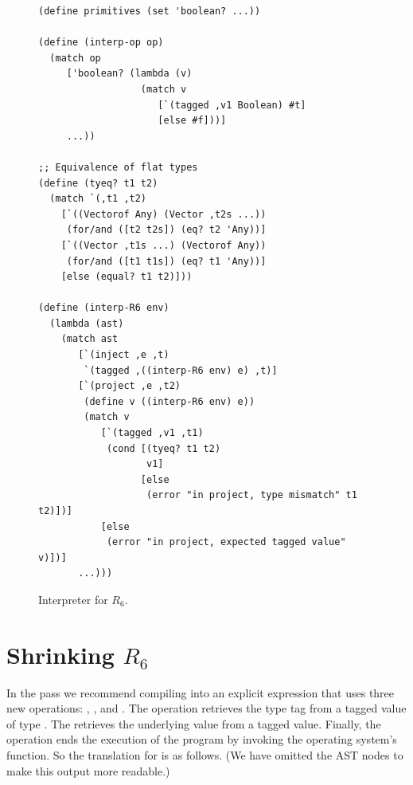 \documentclass[11pt]{book}
\begin{document}

\begin{figure}[btp]
\begin{lstlisting}
(define primitives (set 'boolean? ...))

(define (interp-op op)
  (match op
     ['boolean? (lambda (v)
                  (match v
                     [`(tagged ,v1 Boolean) #t]
                     [else #f]))]
     ...))

;; Equivalence of flat types
(define (tyeq? t1 t2)
  (match `(,t1 ,t2)
    [`((Vectorof Any) (Vector ,t2s ...))
     (for/and ([t2 t2s]) (eq? t2 'Any))]
    [`((Vector ,t1s ...) (Vectorof Any))
     (for/and ([t1 t1s]) (eq? t1 'Any))]
    [else (equal? t1 t2)]))

(define (interp-R6 env)
  (lambda (ast)
    (match ast
       [`(inject ,e ,t)
        `(tagged ,((interp-R6 env) e) ,t)]
       [`(project ,e ,t2)
        (define v ((interp-R6 env) e))
        (match v
           [`(tagged ,v1 ,t1)
            (cond [(tyeq? t1 t2)
                   v1]
                  [else
                   (error "in project, type mismatch" t1 t2)])]
           [else
            (error "in project, expected tagged value" v)])]
       ...)))
\end{lstlisting}
\caption{Interpreter for $R_6$.}
\label{fig:interp-R6}
\end{figure}


\section{Shrinking $R_6$}
\label{sec:shrink-r6}

In the  pass we recommend compiling  into
an explicit  expression that uses three new operations:
, , and .  The
 operation retrieves the type tag from a tagged value
of type .  The  retrieves the underlying
value from a tagged value. Finally, the  operation ends the
execution of the program by invoking the operating system's
 function. So the translation for  is as
follows. (We have omitted the  AST nodes to make this
output more readable.)
\end{document}
